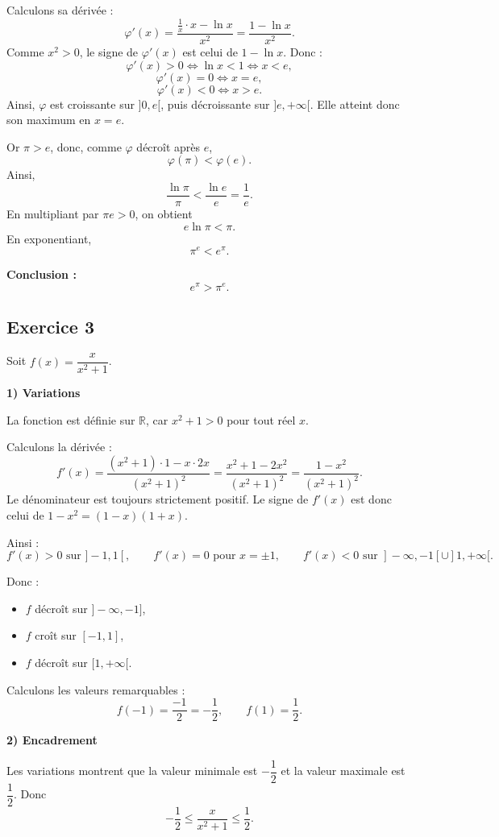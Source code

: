 \documentclass[11pt,a4paper]{article}
\newcommand{\R}{\mathbb{R}}
\begin{document}
Calculons sa dérivée :
\[
\varphi'(x)=\frac{\frac1x\cdot x-\ln x}{x^2}
=\frac{1-\ln x}{x^2}.
\]
Comme \(x^2>0\), le signe de \(\varphi'(x)\) est celui de \(1-\ln x\). Donc :
\[
\varphi'(x)>0 \iff \ln x<1 \iff x<e,
\]
\[
\varphi'(x)=0 \iff x=e,
\]
\[
\varphi'(x)<0 \iff x>e.
\]
Ainsi, \(\varphi\) est croissante sur \(]0,e[\), puis décroissante sur \(]e,+\infty[\).  
Elle atteint donc son maximum en \(x=e\).

Or \(\pi>e\), donc, comme \(\varphi\) décroît après \(e\),
\[
\varphi(\pi)<\varphi(e).
\]
Ainsi,
\[
\frac{\ln \pi}{\pi}<\frac{\ln e}{e}=\frac{1}{e}.
\]
En multipliant par \(\pi e>0\), on obtient
\[
e\ln \pi<\pi.
\]
En exponentiant,
\[
\pi^e<e^\pi.
\]

\textbf{Conclusion :}
\[
\boxed{e^\pi>\pi^e.}
\]

\subsection*{Exercice 3}
Soit \(f(x)=\dfrac{x}{x^2+1}\).

\textbf{1) Variations}

La fonction est définie sur \(\R\), car \(x^2+1>0\) pour tout réel \(x\).

Calculons la dérivée :
\[
f'(x)=\frac{(x^2+1)\cdot 1-x\cdot 2x}{(x^2+1)^2}
=\frac{x^2+1-2x^2}{(x^2+1)^2}
=\frac{1-x^2}{(x^2+1)^2}.
\]
Le dénominateur est toujours strictement positif.  
Le signe de \(f'(x)\) est donc celui de \(1-x^2=(1-x)(1+x)\).

Ainsi :
\[
f'(x)>0 \text{ sur } ]-1,1[,\qquad
f'(x)=0 \text{ pour } x=\pm1,\qquad
f'(x)<0 \text{ sur } ]-\infty,-1[ \cup ]1,+\infty[.
\]

Donc :
\begin{itemize}
    \item \(f\) décroît sur \(]-\infty,-1]\),
    \item \(f\) croît sur \([-1,1]\),
    \item \(f\) décroît sur \([1,+\infty[\).
\end{itemize}

Calculons les valeurs remarquables :
\[
f(-1)=\frac{-1}{2}=-\frac12,\qquad f(1)=\frac12.
\]

\textbf{2) Encadrement}

Les variations montrent que la valeur minimale est \(-\dfrac12\) et la valeur maximale est \(\dfrac12\).  
Donc
\[
\boxed{-\frac12\leq \frac{x}{x^2+1}\leq \frac12.}
\]
\end{document}
